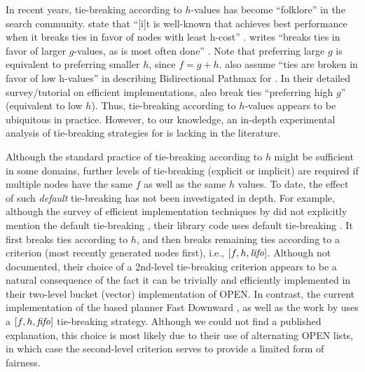 In recent years, tie-breaking according to $h$-values has become ``folklore'' in the search community.
\citeauthor{hansen2007anytime} state that ``[i]t is well-known 
that \astar achieves best performance when it breaks ties
in favor of nodes with least h-cost'' \cite{hansen2007anytime}.
\citeauthor{holte2010common} writes ``\astar breaks ties in favor
of larger $g$-values, as is most often done'' \cite{holte2010common}.
Note that  preferring large $g$ is equivalent to preferring smaller $h$, since $f=g+h$.
 also assume ``ties are broken in
favor of low h-values'' in describing Bidirectional Pathmax for \astar \citeyear{felner2011inconsistent}.
In their detailed survey/tutorial on efficient \astar implementations,
 \citeyear{burns2012implementing}
also break ties ``preferring high $g$'' (equivalent to low $h$).
Thus, tie-breaking according to $h$-values appears
to be ubiquitous in practice. However, 
to our knowledge, an in-depth experimental analysis of tie-breaking strategies for \astar is lacking in the literature.

Although the standard practice of tie-breaking according to $h$ might be
sufficient in some domains, further levels of tie-breaking (explicit or
implicit) are required if multiple nodes have the same $f$ as well as
the same $h$ values. To date, the effect of such \emph{default}
tie-breaking has not been investigated in depth.
% 
For example, although the survey of efficient \astar implementation techniques by \citeauthor{burns2012implementing} 
did not explicitly mention the default
tie-breaking \citeyear{burns2012implementing},  their library
code  uses \lifo
default tie-breaking \cite{BurnsCode}.
% 
It first breaks ties according to $h$, and then
breaks remaining ties according to a \lifo criterion (most recently
generated nodes first), i.e., $[f,h,{\text{\textit{lifo}}}]$.
% 
Although not documented, their choice of a \lifo 2nd-level tie-breaking
criterion appears to be a natural consequence of the fact it can be
trivially and efficiently implemented in their two-level bucket (vector)
implementation of OPEN.
% 
In contrast, the current implementation of the \sota \astar based planner Fast
Downward \cite{Helmert2006}, as well as the work by \citeauthor{RogerH10} \citeyear{RogerH10} uses
a $[f,h,{\text{\textit{fifo}}}]$ tie-breaking strategy.
% 
Although we could not find a published explanation,  %
this choice is most likely due to their use of alternating OPEN
lists, in which case the \fifo second-level criterion serves to provide a
limited form of fairness.
% 
